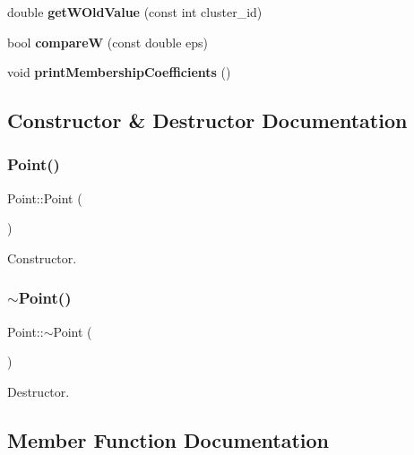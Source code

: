 \begin{DoxyCompactItemize}
\item 
\mbox{\label{class_point_ac61066bda6062de888f81d6f1be673af}} 
double {\bfseries get\+W\+Old\+Value} (const int cluster\+\_\+id)
\item 
\mbox{\label{class_point_aef55db1c7bc1532a739adb36ec88f736}} 
bool {\bfseries compareW} (const double eps)
\item 
\mbox{\label{class_point_a7bbdf413a6d2ea9a6bb83c455cfbe564}} 
void {\bfseries print\+Membership\+Coefficients} ()
\end{DoxyCompactItemize}


\subsection{Constructor \& Destructor Documentation}
\mbox{\label{class_point_ad92f2337b839a94ce97dcdb439b4325a}} 
\subsubsection{\texorpdfstring{Point()}{Point()}}
{\footnotesize\ttfamily Point\+::\+Point (\begin{DoxyParamCaption}{ }\end{DoxyParamCaption})}

Constructor. \mbox{\label{class_point_a395fa04b4ec126b66fc053f829a30cc1}} 
\subsubsection{\texorpdfstring{$\sim$\+Point()}{~Point()}}
{\footnotesize\ttfamily Point\+::$\sim$\+Point (\begin{DoxyParamCaption}{ }\end{DoxyParamCaption})}

Destructor. 

\subsection{Member Function Documentation}
\mbox{\label{class_point_a922f5f0685f0bbf2e9e19ff3397fc82e}} 
